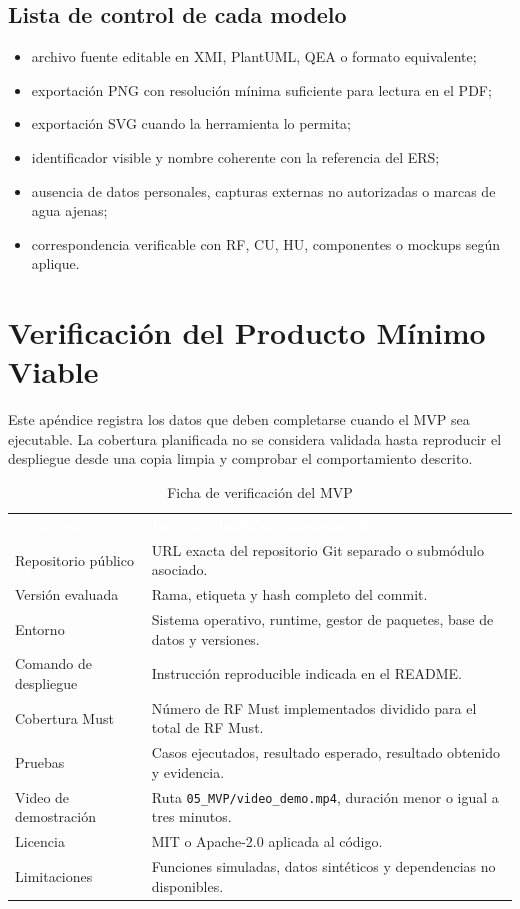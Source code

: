 \documentclass[12pt,a4paper]{article}
\begin{document}
\subsection{Lista de control de cada modelo}

\begin{itemize}
  \item archivo fuente editable en XMI, PlantUML, QEA o formato equivalente;
  \item exportación PNG con resolución mínima suficiente para lectura en el PDF;
  \item exportación SVG cuando la herramienta lo permita;
  \item identificador visible y nombre coherente con la referencia del ERS;
  \item ausencia de datos personales, capturas externas no autorizadas o marcas de agua ajenas;
  \item correspondencia verificable con RF, CU, HU, componentes o mockups según aplique.
\end{itemize}

\section{Verificación del Producto Mínimo Viable}
\label{ap:verificacion-mvp}

Este apéndice registra los datos que deben completarse cuando el MVP sea ejecutable. La cobertura planificada no se considera validada hasta reproducir el despliegue desde una copia limpia y comprobar el comportamiento descrito.

\begin{table}[H]
\centering
\caption{Ficha de verificación del MVP}
\label{tab:ficha-verificacion-mvp}
\small
{}
\begin{tabularx}{\textwidth}{L{4.10cm} Y}
\textcolor{white}{\textbf{Elemento}} &
\textcolor{white}{\textbf{Dato o criterio de comprobación}}\\
Repositorio público & URL exacta del repositorio Git separado o submódulo asociado.\\
Versión evaluada & Rama, etiqueta y hash completo del commit.\\
Entorno & Sistema operativo, runtime, gestor de paquetes, base de datos y versiones.\\
Comando de despliegue & Instrucción reproducible indicada en el README.\\
Cobertura Must & Número de RF Must implementados dividido para el total de RF Must.\\
Pruebas & Casos ejecutados, resultado esperado, resultado obtenido y evidencia.\\
Video de demostración & Ruta \nolinkurl{05_MVP/video_demo.mp4}, duración menor o igual a tres minutos.\\
Licencia & MIT o Apache-2.0 aplicada al código.\\
Limitaciones & Funciones simuladas, datos sintéticos y dependencias no disponibles.\\
\end{tabularx}
\end{table}
\end{document}
